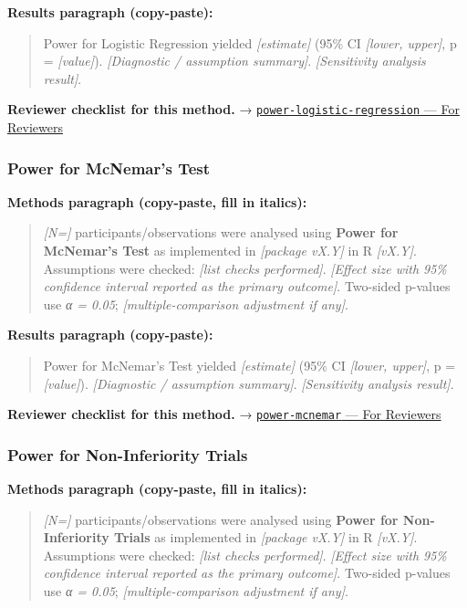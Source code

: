 \documentclass[
]{article}
\begin{document}
\textbf{Results paragraph (copy-paste):}

\begin{quote}
Power for Logistic Regression yielded \emph{{[}estimate{]}} (95\% CI
\emph{{[}lower, upper{]}}, p = \emph{{[}value{]}}). \emph{{[}Diagnostic
/ assumption summary{]}}. \emph{{[}Sensitivity analysis result{]}}.
\end{quote}

\textbf{Reviewer checklist for this method.} →
\href{../chapters/05-power/power-logistic-regression.Rmd\#for-reviewers}{\texttt{power-logistic-regression}
--- For Reviewers}

\subsubsection{Power for McNemar's Test}\label{power-for-mcnemars-test}

\textbf{Methods paragraph (copy-paste, fill in italics):}

\begin{quote}
\emph{{[}N={]}} participants/observations were analysed using
\textbf{Power for McNemar's Test} as implemented in \emph{{[}package
vX.Y{]}} in R \emph{{[}vX.Y{]}}. Assumptions were checked: \emph{{[}list
checks performed{]}}. \emph{{[}Effect size with 95\% confidence interval
reported as the primary outcome{]}}. Two-sided p-values use \emph{α =
0.05}; \emph{{[}multiple-comparison adjustment if any{]}}.
\end{quote}

\textbf{Results paragraph (copy-paste):}

\begin{quote}
Power for McNemar's Test yielded \emph{{[}estimate{]}} (95\% CI
\emph{{[}lower, upper{]}}, p = \emph{{[}value{]}}). \emph{{[}Diagnostic
/ assumption summary{]}}. \emph{{[}Sensitivity analysis result{]}}.
\end{quote}

\textbf{Reviewer checklist for this method.} →
\href{../chapters/05-power/power-mcnemar.Rmd\#for-reviewers}{\texttt{power-mcnemar}
--- For Reviewers}

\subsubsection{Power for Non-Inferiority
Trials}\label{power-for-non-inferiority-trials}

\textbf{Methods paragraph (copy-paste, fill in italics):}

\begin{quote}
\emph{{[}N={]}} participants/observations were analysed using
\textbf{Power for Non-Inferiority Trials} as implemented in
\emph{{[}package vX.Y{]}} in R \emph{{[}vX.Y{]}}. Assumptions were
checked: \emph{{[}list checks performed{]}}. \emph{{[}Effect size with
95\% confidence interval reported as the primary outcome{]}}. Two-sided
p-values use \emph{α = 0.05}; \emph{{[}multiple-comparison adjustment if
any{]}}.
\end{quote}
\end{document}
